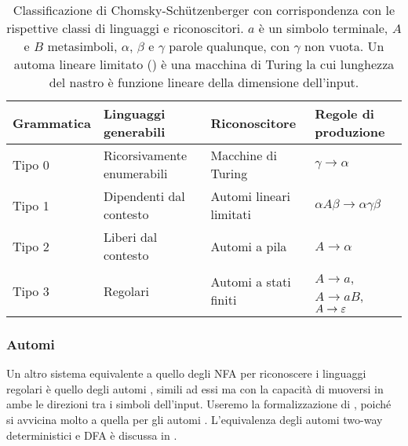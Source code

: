 \begin{table}
	\caption{Classificazione di Chomsky-Schützenberger con corrispondenza con le rispettive classi di linguaggi e riconoscitori. $a$ è un simbolo terminale, $A$ e $B$ metasimboli, $\alpha$, $\beta$ e $\gamma$ parole qualunque, con $\gamma$ non vuota. Un automa lineare limitato () è una macchina di Turing la cui lunghezza del nastro è funzione lineare della dimensione dell'input.}
	\label{tab:prel:chomskyhier}
	\centering
	\begin{tabularx}{\textwidth}{lXXl}
		\toprule
		\textbf{Grammatica} & \textbf{Linguaggi generabili} & \textbf{Riconoscitore}  & \textbf{Regole di produzione}         \\
		\midrule
		Tipo 0              & Ricorsivamente enumerabili    & Macchine di Turing      & $\gamma\to\alpha$                     \\
		Tipo 1              & Dipendenti dal contesto       & Automi lineari limitati & $\alpha A\beta\to\alpha\gamma\beta$   \\
		Tipo 2              & Liberi dal contesto           & Automi a pila           & $A\to\alpha$                          \\
		Tipo 3              & Regolari                      & Automi a stati finiti   & $A\to a$, $A\to aB$, $A\to\varepsilon$ \\
		\bottomrule
	\end{tabularx}
\end{table}

\subsubsection{Automi }
Un altro sistema equivalente a quello degli NFA per riconoscere i linguaggi regolari è quello degli automi , simili ad essi ma con la capacità di muoversi in ambe le direzioni tra i simboli dell'input. Useremo la formalizzazione di \cite{Pighizzini:14:limitedRE}, poiché si avvicina molto a quella per gli automi . L'equivalenza degli automi two-way deterministici e DFA è discussa in \cite{Shallit:09:secondLFA}.

